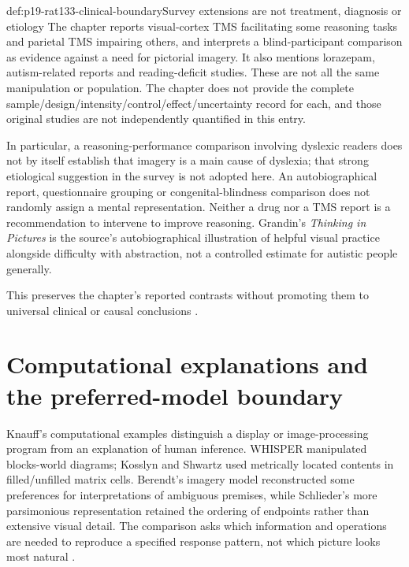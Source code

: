 \begin{proofboundary}{def:p19-rat133-clinical-boundary}{Survey extensions are not treatment, diagnosis or etiology}
The chapter reports visual-cortex TMS facilitating some reasoning tasks and
parietal TMS impairing others, and interprets a blind-participant comparison
as evidence against a need for pictorial imagery. It also mentions lorazepam,
autism-related reports and reading-deficit studies. These are not all the
same manipulation or population. The chapter does not provide the complete
sample/design/intensity/control/effect/uncertainty record for each, and those
original studies are not independently quantified in this entry.

In particular, a reasoning-performance comparison involving dyslexic readers
does not by itself establish that imagery is a main cause of dyslexia; that
strong etiological suggestion in the survey is not adopted here. An
autobiographical report, questionnaire grouping or congenital-blindness
comparison does not randomly assign a mental representation. Neither a
drug nor a TMS report is a recommendation to intervene to improve reasoning.
Grandin's \emph{Thinking in Pictures} is the source's autobiographical
illustration of helpful visual practice alongside difficulty with abstraction,
not a controlled estimate for autistic people generally.
\end{proofboundary}

This preserves the chapter's reported contrasts without promoting them
to universal clinical or causal conclusions
\parencite[pp.~735,738--739]{Knauff2021VisualizationRationality}.

\section{Computational explanations and the preferred-model boundary}
\label{sec:p19-rat133-models}

Knauff's computational examples distinguish a display or image-processing
program from an explanation of human inference. WHISPER manipulated
blocks-world diagrams; Kosslyn and Shwartz used metrically located contents
in filled/unfilled matrix cells. Berendt's imagery model reconstructed some
preferences for interpretations of ambiguous premises, while Schlieder's
more parsimonious representation retained the ordering of endpoints rather
than extensive visual detail. The comparison asks which information and
operations are needed to reproduce a specified response pattern, not which
picture looks most natural \parencite[p.~740]{Knauff2021VisualizationRationality}.

